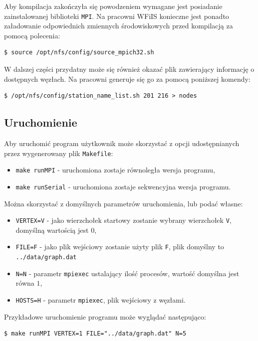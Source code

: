 \documentclass[12pt]{article}
\begin{document}
Aby kompilacja zakończyła się powodzeniem wymagane jest posiadanie zainstalowanej biblioteki \lstinline|MPI|. Na pracowni WFiIS konieczne jest ponadto załadowanie odpowiednich zmiennych środowiskowych przed kompilacją za pomocą polecenia:
\begin{lstlisting}
$ source /opt/nfs/config/source_mpich32.sh
\end{lstlisting}

W dalszej części przydatny może się również okazać plik zawierający informację o dostępnych węzłach. Na pracowni generuje się go za pomocą poniższej komendy:
\begin{lstlisting}
$ /opt/nfs/config/station_name_list.sh 201 216 > nodes
\end{lstlisting}

\subsection{Uruchomienie} \label{sec:uru}

Aby uruchomić program użytkownik może skorzystać z opcji udostępnianych przez wygenerowany plik \lstinline|Makefile|:
\begin{itemize}
\item  \lstinline|make runMPI| - uruchomiona zostaje równoległa wersja programu,
\item  \lstinline|make runSerial| - uruchomiona zostaje sekwencyjna wersja programu.
\end{itemize}

\noindent
Można skorzystać z domyślnych parametrów uruchomienia, lub podać własne:
\begin{itemize}
\item  \lstinline|VERTEX=V| - jako wierzchołek startowy zostanie wybrany wierzchołek \lstinline|V|, domyślną wartością jest $0$,
\item  \lstinline|FILE=F| - jako plik wejściowy zostanie użyty plik \lstinline|F|, plik domyślny to \lstinline{../data/graph.dat}
\item  \lstinline|N=N| - parametr \lstinline|mpiexec| ustalający ilość procesów, wartość domyślna jest równa $1$,
\item  \lstinline|HOSTS=H| -  parametr \lstinline|mpiexec|, plik wejściowy z węzłami.
\end{itemize}

\noindent
Przykładowe uruchomienie programu może wyglądać następująco:
\begin{lstlisting}
$ make runMPI VERTEX=1 FILE="../data/graph.dat" N=5
\end{lstlisting}
\end{document}
